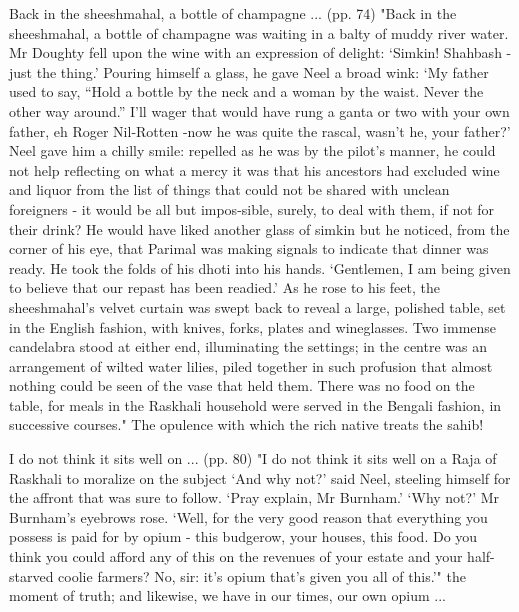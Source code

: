 Back in the sheeshmahal, a bottle of champagne ... (pp. 74)
"Back in the sheeshmahal, a bottle of champagne was waiting in a balty of muddy river water. Mr Doughty fell upon the wine with an expression of delight: ‘Simkin! Shahbash -just the thing.’ Pouring himself a glass, he gave Neel a broad wink: ‘My father used to say, “Hold a bottle by the neck and a woman by the waist. Never the other way around.” I’ll wager that would have rung a ganta or two with your own father, eh Roger Nil-Rotten -now he was quite the rascal, wasn’t he, your father?’ Neel gave him a chilly smile: repelled as he was by the pilot’s manner, he could not help reflecting on what a mercy it was that his ancestors had excluded wine and liquor from the list of things that could not be shared with unclean foreigners - it would be all but impos-sible, surely, to deal with them, if not for their drink? He would have liked another glass of simkin but he noticed, from the corner of his eye, that Parimal was making signals to indicate that dinner was ready. He took the folds of his dhoti into his hands. ‘Gentlemen, I am being given to believe that our repast has been readied.’ As he rose to his feet, the sheeshmahal’s velvet curtain was swept back to reveal a large, polished table, set in the English fashion, with knives, forks, plates and wineglasses. Two immense candelabra stood at either end, illuminating the settings; in the centre was an arrangement of wilted water lilies, piled together in such profusion that almost nothing could be seen of the vase that held them. There was no food on the table, for meals in the Raskhali household were served in the Bengali fashion, in successive courses."
The opulence with which the rich native treats the sahib!

I do not think it sits well on ... (pp. 80)
"I do not think it sits well on a Raja of Raskhali to moralize on the subject ‘And why not?’ said Neel, steeling himself for the affront that was sure to follow. ‘Pray explain, Mr Burnham.’ ‘Why not?’ Mr Burnham’s eyebrows rose. ‘Well, for the very good reason that everything you possess is paid for by opium - this budgerow, your houses, this food. Do you think you could afford any of this on the revenues of your estate and your half-starved coolie farmers? No, sir: it’s opium that’s given you all of this.’"
the moment of truth; and likewise, we have in our times, our own opium ...

